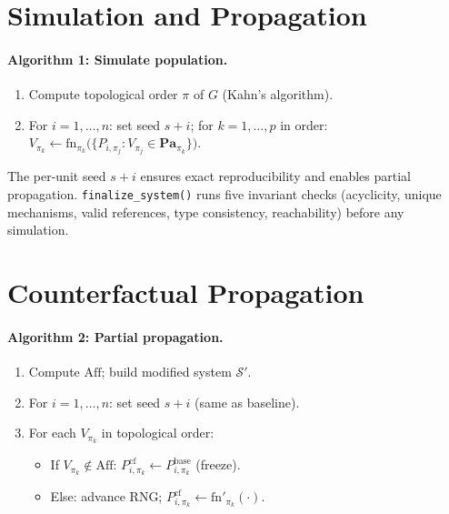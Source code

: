 \documentclass[12pt,a4paper]{article}
\newcommand{\code}[1]{\texttt{#1}}
\begin{document}
\section{Simulation and Propagation}
\label{sec:simulation}

\paragraph{Algorithm 1: Simulate population.}
\begin{enumerate}
  \item Compute topological order $\pi$ of $G$ (Kahn's algorithm).
  \item For $i = 1,\ldots,n$: set seed $s+i$; for $k=1,\ldots,p$ in order: $V_{\pi_k} \leftarrow \mathrm{fn}_{\pi_k}\!\bigl(\{P_{i,\pi_j} : V_{\pi_j}\in\mathbf{Pa}_{\pi_k}\}\bigr)$.
\end{enumerate}

The per-unit seed $s+i$ ensures exact reproducibility and enables partial propagation. \code{finalize\_system()} runs five invariant checks (acyclicity, unique mechanisms, valid references, type consistency, reachability) before any simulation.

\section{Counterfactual Propagation}
\label{sec:counterfactual}

\paragraph{Algorithm 2: Partial propagation.}
\begin{enumerate}
  \item Compute $\mathrm{Aff}$; build modified system $\mathcal{S}'$.
  \item For $i=1,\ldots,n$: set seed $s+i$ (same as baseline).
  \item For each $V_{\pi_k}$ in topological order:
    \begin{itemize}
      \item If $V_{\pi_k}\notin\mathrm{Aff}$: $P^{\text{cf}}_{i,\pi_k} \leftarrow P^{\text{base}}_{i,\pi_k}$ (freeze).
      \item Else: advance RNG; $P^{\text{cf}}_{i,\pi_k} \leftarrow \mathrm{fn}'_{\pi_k}(\cdot)$.
    \end{itemize}
\end{enumerate}
\end{document}
